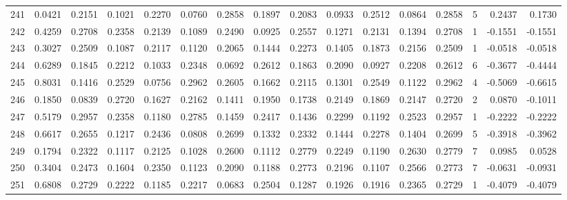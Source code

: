 \begin{tabular}{lrrrrrrrrrrrrrrr}
241 &      0.0421 &  0.2151 &  0.1021 &  0.2270 &  0.0760 &  0.2858 &  0.1897 &  0.2083 &  0.0933 &  0.2512 &   0.0864 &     0.2858 &      5 &                    0.2437 &                     0.1730 \\
242 &      0.4259 &  0.2708 &  0.2358 &  0.2139 &  0.1089 &  0.2490 &  0.0925 &  0.2557 &  0.1271 &  0.2131 &   0.1394 &     0.2708 &      1 &                   -0.1551 &                    -0.1551 \\
243 &      0.3027 &  0.2509 &  0.1087 &  0.2117 &  0.1120 &  0.2065 &  0.1444 &  0.2273 &  0.1405 &  0.1873 &   0.2156 &     0.2509 &      1 &                   -0.0518 &                    -0.0518 \\
244 &      0.6289 &  0.1845 &  0.2212 &  0.1033 &  0.2348 &  0.0692 &  0.2612 &  0.1863 &  0.2090 &  0.0927 &   0.2208 &     0.2612 &      6 &                   -0.3677 &                    -0.4444 \\
245 &      0.8031 &  0.1416 &  0.2529 &  0.0756 &  0.2962 &  0.2605 &  0.1662 &  0.2115 &  0.1301 &  0.2549 &   0.1122 &     0.2962 &      4 &                   -0.5069 &                    -0.6615 \\
246 &      0.1850 &  0.0839 &  0.2720 &  0.1627 &  0.2162 &  0.1411 &  0.1950 &  0.1738 &  0.2149 &  0.1869 &   0.2147 &     0.2720 &      2 &                    0.0870 &                    -0.1011 \\
247 &      0.5179 &  0.2957 &  0.2358 &  0.1180 &  0.2785 &  0.1459 &  0.2417 &  0.1436 &  0.2299 &  0.1192 &   0.2523 &     0.2957 &      1 &                   -0.2222 &                    -0.2222 \\
248 &      0.6617 &  0.2655 &  0.1217 &  0.2436 &  0.0808 &  0.2699 &  0.1332 &  0.2332 &  0.1444 &  0.2278 &   0.1404 &     0.2699 &      5 &                   -0.3918 &                    -0.3962 \\
249 &      0.1794 &  0.2322 &  0.1117 &  0.2125 &  0.1028 &  0.2600 &  0.1112 &  0.2779 &  0.2249 &  0.1190 &   0.2630 &     0.2779 &      7 &                    0.0985 &                     0.0528 \\
250 &      0.3404 &  0.2473 &  0.1604 &  0.2350 &  0.1123 &  0.2090 &  0.1188 &  0.2773 &  0.2196 &  0.1107 &   0.2566 &     0.2773 &      7 &                   -0.0631 &                    -0.0931 \\
251 &      0.6808 &  0.2729 &  0.2222 &  0.1185 &  0.2217 &  0.0683 &  0.2504 &  0.1287 &  0.1926 &  0.1916 &   0.2365 &     0.2729 &      1 &                   -0.4079 &                    -0.4079 \\

\end{tabular}
